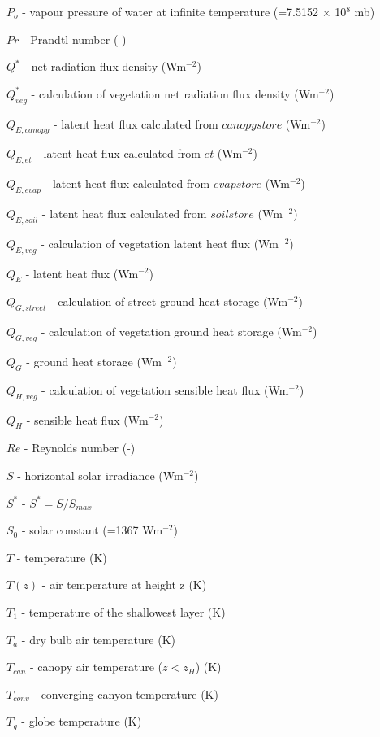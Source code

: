 {\begin{description}
\item $P_{o}$  -  vapour pressure of water at infinite temperature (=7.5152 $\times$ 10$^8$ mb) 
\item $Pr$  -  Prandtl number (-) 
\item $Q^{*}$  -   net radiation flux density (Wm$^{-2}$) 
\item $Q^{*}_{veg}$  -   calculation of vegetation net radiation flux density (Wm$^{-2}$)
\item $Q_{E,canopy}$  -   latent heat flux calculated from $canopystore$ (Wm$^{-2}$) 
\item $Q_{E,et}$  -  latent heat flux calculated from $et$ (Wm$^{-2}$) 
\item $Q_{E,evap}$  -   latent heat flux calculated from $evapstore$ (Wm$^{-2}$) 
\item $Q_{E,soil}$  -   latent heat flux calculated from $soilstore$ (Wm$^{-2}$) 
\item $Q_{E,veg}$  -   calculation of vegetation latent heat flux (Wm$^{-2}$) 
\item $Q_{E}$  -   latent heat flux (Wm$^{-2}$)
\item $Q_{G,street}$  -   calculation of street ground heat storage (Wm$^{-2}$) 
\item $Q_{G,veg}$  -   calculation of vegetation ground heat storage (Wm$^{-2}$) 
\item $Q_{G}$  -   ground heat storage (Wm$^{-2}$) 
\item $Q_{H,veg}$  -     calculation of vegetation sensible heat flux (Wm$^{-2}$) 
\item $Q_{H}$  -     sensible heat flux (Wm$^{-2}$) 
\item $Re$  -  Reynolds number (-) 
\item $S$  -  horizontal solar irradiance (Wm$^{-2}$)  
\item $S^{*}$  -  $S^{*} = S/S_{max}$ 
\item $S_{0}$  -  solar constant (=1367 Wm$^{-2}$) 
\item $T$  -  temperature (K) 
\item $T(z)$  -   air temperature at height z (K) 
\item $T_{1}$  -  temperature of the shallowest layer (K) 
\item $T_{a}$  -  dry bulb air temperature (K) 
\item $T_{can}$  -    canopy air temperature ($z < z_{H}$) (K) 
\item $T_{conv}$  -   converging canyon temperature (K) 
\item $T_{g}$  -  globe temperature (K) 

\end{description}}
